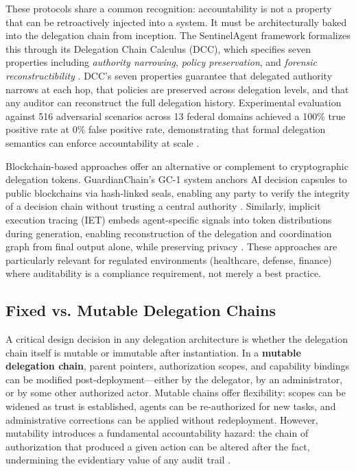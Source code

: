 These protocols share a common recognition: accountability is not a property that can be retroactively injected into a system. It must be architecturally baked into the delegation chain from inception. The SentinelAgent framework formalizes this through its Delegation Chain Calculus (DCC), which specifies seven properties including \emph{authority narrowing}, \emph{policy preservation}, and \emph{forensic reconstructibility} \cite{sentinel_2025}. DCC's seven properties guarantee that delegated authority narrows at each hop, that policies are preserved across delegation levels, and that any auditor can reconstruct the full delegation history. Experimental evaluation against 516 adversarial scenarios across 13 federal domains achieved a 100\% true positive rate at 0\% false positive rate, demonstrating that formal delegation semantics can enforce accountability at scale \cite{sentinel_2025}.

Blockchain-based approaches offer an alternative or complement to cryptographic delegation tokens. GuardianChain's GC-1 system anchors AI decision capsules to public blockchains via hash-linked seals, enabling any party to verify the integrity of a decision chain without trusting a central authority \cite{cronin_2025_guardianchain}. Similarly, implicit execution tracing (IET) embeds agent-specific signals into token distributions during generation, enabling reconstruction of the delegation and coordination graph from final output alone, while preserving privacy \cite{iet_2025}. These approaches are particularly relevant for regulated environments (healthcare, defense, finance) where auditability is a compliance requirement, not merely a best practice.

\subsection{Fixed vs. Mutable Delegation Chains}
\label{sec:background_delegation}

A critical design decision in any delegation architecture is whether the delegation chain itself is mutable or immutable after instantiation. In a \textbf{mutable delegation chain}, parent pointers, authorization scopes, and capability bindings can be modified post-deployment---either by the delegator, by an administrator, or by some other authorized actor. Mutable chains offer flexibility: scopes can be widened as trust is established, agents can be re-authorized for new tasks, and administrative corrections can be applied without redeployment. However, mutability introduces a fundamental accountability hazard: the chain of authorization that produced a given action can be altered after the fact, undermining the evidentiary value of any audit trail \cite{cronin_2025_guardianchain}.

